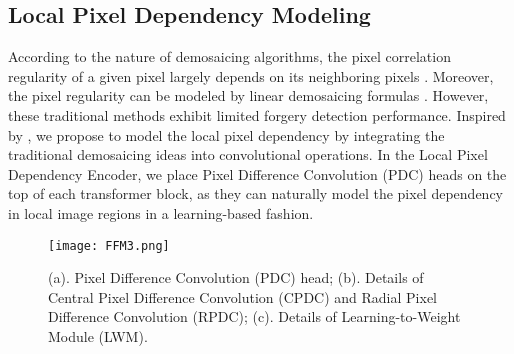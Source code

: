 \documentclass[10pt,journal,compsoc]{IEEEtran}
\begin{document}
\subsection{Local Pixel Dependency Modeling}


According to the nature of demosaicing algorithms, the pixel correlation regularity of a given pixel largely depends on its neighboring pixels \cite{cao2009accurate, cao2009accurate2}. Moreover, the pixel regularity can be modeled by linear demosaicing formulas \cite{cao2009accurate, li2016color}. However, these traditional methods exhibit limited forgery detection performance. Inspired by \cite{yu2020searching, su2021pixel, liu2012extended}, we propose to model the local pixel dependency by integrating the traditional demosaicing ideas into convolutional operations. In the Local Pixel Dependency Encoder, we place Pixel Difference Convolution (PDC) heads on the top of each transformer block, as they can naturally model the pixel dependency in local image regions in a learning-based fashion. 

\begin{figure}[ht]
\centering
\texttt{[image:  FFM3.png]}
\caption{(a). Pixel Difference Convolution (PDC) head; (b). Details of Central Pixel Difference Convolution (CPDC) and Radial Pixel Difference Convolution (RPDC); (c). Details of Learning-to-Weight Module (LWM).}
\label{FFM}
\end{figure}
\end{document}
